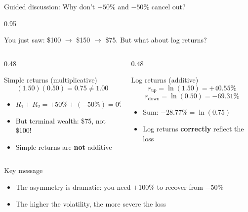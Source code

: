 \documentclass[9pt, aspectratio=169, t]{beamer}
\begin{document}
\begin{frame}[shrink=3]{Guided discussion: Why don't $+50\%$ and $-50\%$ cancel out?}
    \begin{cminipage}{0.95\textwidth}
    \begin{alertblock}{You just saw: \$100 $\to$ \$150 $\to$ \$75. But what about log returns?}
    \end{alertblock}
    \vspace{0.2cm}
    \begin{columns}[T]
    \begin{column}{0.48\textwidth}
    \begin{block}{Simple returns (multiplicative)}
    \[
    (1.50)(0.50) = 0.75 \neq 1.00
    \]
    \begin{itemize}\setlength{\itemsep}{0pt}
        \item $R_1 + R_2 = +50\% + (-50\%) = 0\%$
        \item But terminal wealth: \$75, not \$100!
        \item Simple returns are \textbf{not} additive
    \end{itemize}
    \end{block}
    \end{column}
    \begin{column}{0.48\textwidth}
    \begin{exampleblock}{Log returns (additive)}
    \[
    r_{\text{up}} = \ln(1.50) = +40.55\%
    \]
    \[
    r_{\text{down}} = \ln(0.50) = -69.31\%
    \]
    \begin{itemize}\setlength{\itemsep}{0pt}
        \item Sum: $-28.77\% = \ln(0.75)$ \checkmark
        \item Log returns \textbf{correctly} reflect the loss
    \end{itemize}
    \end{exampleblock}
    \end{column}
    \end{columns}
    \vspace{0.2cm}
    \begin{alertblock}{Key message}
    \begin{itemize}\setlength{\itemsep}{0pt}
        \item The asymmetry is dramatic: you need $+100\%$ to recover from $-50\%$
        \item The higher the volatility, the more severe the loss
    \end{itemize}
    \end{alertblock}
    \end{cminipage}
\end{frame}
\end{document}
